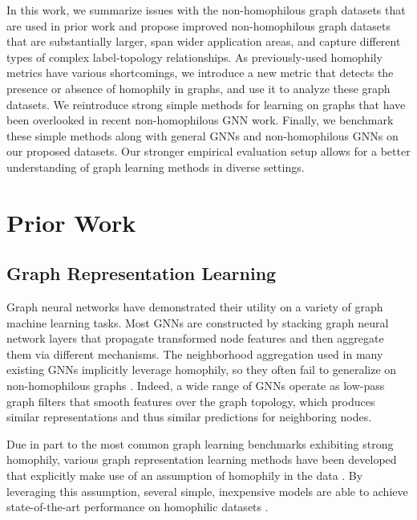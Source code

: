 \documentclass[sigconf, balance=false]{acmart}
\begin{document}
In this work, we summarize issues with the non-homophilous graph datasets that are used in prior work and propose improved non-homophilous graph datasets that are substantially larger, span wider application areas, and capture different types of complex label-topology relationships.
As previously-used homophily metrics have various shortcomings, we introduce a new metric that detects the presence or absence of homophily in graphs, and use it to analyze these graph datasets.
We reintroduce strong simple methods for learning on graphs that have been overlooked in recent non-homophilous GNN work. Finally, we benchmark these simple methods along with general GNNs and non-homophilous GNNs on our proposed datasets. Our stronger empirical evaluation setup allows for a better understanding of graph learning methods in diverse settings.


\section{Prior Work}

\subsection{Graph Representation Learning}

Graph neural networks \cite{hamilton2017inductive, kipf2017semi, velivckovic2018graph} have demonstrated their utility on a variety of graph machine learning tasks. Most GNNs are constructed by stacking graph neural network layers that propagate transformed node features and then aggregate them via different mechanisms. The neighborhood aggregation used in many existing GNNs implicitly leverage homophily, so they often fail to generalize on non-homophilous graphs \cite{zhu2020beyond, balcilar2021analyzing}. Indeed, a wide range of GNNs operate as low-pass graph filters \cite{nt2019revisiting, wu2019simplifying, balcilar2021analyzing} that smooth features over the graph topology, which produces similar representations and thus similar predictions for neighboring nodes. 

Due in part to the most common graph learning benchmarks exhibiting strong homophily, various graph representation learning methods have been developed that explicitly make use of an assumption of homophily in the data \cite{wu2019simplifying, huang2021combining, deng2020graphzoom, klicpera2019diffusion, bojchevski2020scaling}. By leveraging this assumption, several simple, inexpensive models are able to achieve state-of-the-art performance on homophilic datasets \cite{wu2019simplifying, huang2021combining}.
\end{document}

